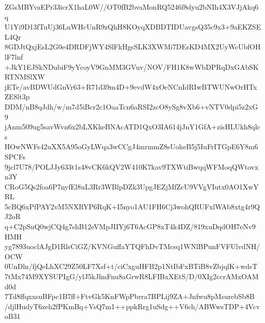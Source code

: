 ZGsMBYvaEPr33icrX1haL0W//OT0fB2bvaMonRQ5246f8dyu2bNIh4X3VJjAkq6q
U1Yi9D13fTuUj36LuWHcUnR9zQhH8KOyqXDBDTIDUavgsQ35c9x3+9aEKZSEL4Qr
8GDJtQxjEsL2G0e4DRDFjWY4SlFkHgsSLK3XWMi7DEsKD4MX2UyWcUbfOHlF7lnf
+JkY1EJSkNDubiF9yYcoyV9GnMM3GVuv/NOV/FH1K8wWbDPRqDxGAbSKRTNMSlXW
jETe/avBDWUdGnVr63+R71d39m4D+9evdW4xOeNCnIdRIwBTWUNwOrHTxZE8lt3p
DDM/nB8qJdh/w/m7d5iBcr2c1OaaTcn6aRSI2zcO8ySg8vXb6+vNTV0dpi5z2xG9
jAnm509ug5savWvn6x2bLXKkeBNAcATD1QxO3IA614jJnY1GfA+zisHLUkh8qlcs
HOwNWFs42uXX5A95oGyLWqa3wCCgJ4mrmmZ8sUoheB5j5IuFrITGpE6Y8m6SPCFs
9jcl7U78/POLJJy633t1s48vCK6kQV2W410K7kav9TXWtiBwqqWFMoqQWtovxn3Y
CRoG5Qs2foa6P7nyfEl8uL3Rr3WBlpDZk3UpgJEZjMfZcU9VVgVIutx0AO1XwYRL
5cBQ6xPfPAY2vM5NXRYP6RqK+I5nyo1AU1FH6Cj3wohQRUFxlWAb8xtg4r9QJ2oR
q+C2pSuQ0wjCQ4g7shB12eVMpJIIYj6T6AcGP8xT4k4DZ/819xuDqdOH7eNv9HMH
yg7893uoclAJgD1RlsCiGZ/KVNGuffaYTQFhDvTMcsq1WNlBPunFVFUlvdNH/OCW
0UnDln/fjQeLhXC29Z50LF7Xsf+t/ciCxguHFB2p1NtIbFxBTiB8vZbjqlK+wdsT
7tMx74M9XYSUPIgG/ylJ5kJlmFnu8aGrwR8LFIBxXEtS/D/0XIg2ccrAMxOAMd0d
7Td8ffqxxsuBFpc1B7ff+FtvGk5KnFWpPbrra7BPLij9ZA+Jnfwu8pMsurebSb8B
/djlHudyT6zeh2fPKmBq+VsQ7m1++ppkRrg1uSdg++V6ch/ABWwsTDP+4VcvoB31

